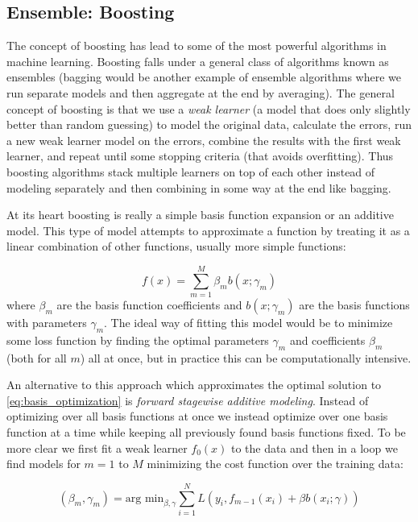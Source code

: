 \documentclass[paper=a4, fontsize=11pt]{scrartcl} %
\numberwithin{equation}{section} %
\numberwithin{figure}{section} %
\numberwithin{table}{section} %
\begin{document}
\subsection{Ensemble: Boosting}

The concept of boosting has lead to some of the most powerful algorithms in machine learning. Boosting falls under a general class of algorithms known as ensembles (bagging would be another example of ensemble algorithms where we run separate models and then aggregate at the end by averaging). The general concept of boosting is that we use a \emph{weak learner} (a model that does only slightly better than random guessing) to model the original data, calculate the errors, run a new weak learner model on the errors, combine the results with the first weak learner, and repeat until some stopping criteria (that avoids overfitting). Thus boosting algorithms stack multiple learners on top of each other instead of modeling separately and then combining in some way at the end like bagging.

At its heart boosting is really a simple basis function expansion or an additive model. This type of model attempts to approximate a function by treating it as a linear combination of other functions, usually more simple functions:

\begin{equation} \label{eq:basis_optimization}
f(x) = \sum^{M}_{m=1} {\beta_m b(x; \gamma_m)}
\end{equation}
where $\beta_m$ are the basis function coefficients and $b(x; \gamma_m)$ are the basis functions with parameters $\gamma_m$. 
The ideal way of fitting this model would be to minimize some loss function by finding the optimal parameters $\gamma_m$ and coefficients $\beta_m$ (both for all $m$) all at once, but in practice this can be computationally intensive. 

An alternative to this approach which approximates the optimal solution to \ref{eq:basis_optimization} is \emph{forward stagewise additive modeling}. Instead of optimizing over all basis functions at once we instead optimize over one basis function at a time while keeping all previously found basis functions fixed. To be more clear we first fit a weak learner $f_0(x)$ to the data and then in a loop we find models for $m=1$ to $M$ minimizing the cost function over the training data:

\begin{equation}
(\beta_m, \gamma_m) = \text{arg min}_{\beta, \gamma} \sum_{i=1}^{N}{L(y_i, f_{m-1}(x_i) + \beta b(x_i;\gamma))}
\end{equation}
\end{document}

